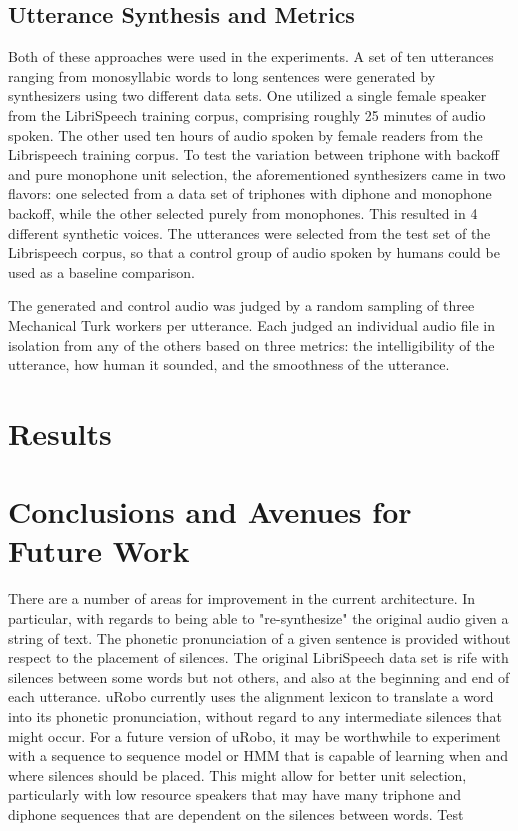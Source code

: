 \documentclass[10pt,a4paper,twocolumn]{article}
\begin{document}
\subsection{Utterance Synthesis and Metrics}
Both of these approaches were used in the experiments. A set of ten utterances ranging from monosyllabic words to long sentences were generated by synthesizers using two different data sets. One utilized a single female speaker from the LibriSpeech training corpus, comprising roughly 25 minutes of audio spoken. The other used ten hours of audio spoken by female readers from the Librispeech training corpus. To test the variation between triphone with backoff and pure monophone unit selection, the aforementioned synthesizers came in two flavors: one selected from a data set of triphones with diphone and monophone backoff, while the other selected purely from monophones. This resulted in 4 different synthetic voices. The utterances were selected from the test set of the Librispeech corpus, so that a control group of audio spoken by humans could be used as a baseline comparison.\par
The generated and control audio was judged by a random sampling of three Mechanical Turk workers per utterance. Each judged an individual audio file in isolation from any of the others based on three metrics: the intelligibility of the utterance, how human it sounded, and the smoothness of the utterance.
\section{Results}
\section{Conclusions and Avenues for Future Work}
There are a number of areas for improvement in the current architecture. In particular, with regards to being able to "re-synthesize" the original audio given a string of text. The phonetic pronunciation of a given sentence is provided without respect to the placement of silences. The original LibriSpeech data set is rife with silences between some words but not others, and also at the beginning and end of each utterance. uRobo currently uses the alignment lexicon to translate a word into its phonetic pronunciation, without regard to any intermediate silences that might occur. For a future version of uRobo, it may be worthwhile to experiment with a sequence to sequence model or HMM that is capable of learning when and where silences should be placed. This might allow for better unit selection, particularly with low resource speakers that may have many triphone and diphone sequences that are dependent on the silences between words.
Test
\newpage
 


\end{document}
